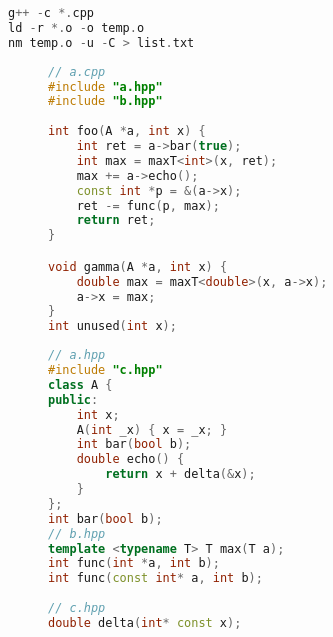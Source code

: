 \begin{lstlisting}[language=C++, caption={Các câu lệnh tìm nguyên mẫu hàm thiếu định nghĩa cần quan tâm sử dụng trình biên dịch.}, label={cod:command-undef},  captionpos=b]
g++ -c *.cpp
ld -r *.o -o temp.o
nm temp.o -u -C > list.txt
\end{lstlisting}

\begin{figure}[t]
    \begin{minipage}[t]{0.49\linewidth}
    \begin{lstlisting}[language=C++, caption={Mã nguồn tệp a.cpp.}, label={cod:undef-cpp}, captionpos=b]
// a.cpp
#include "a.hpp"
#include "b.hpp"
    
int foo(A *a, int x) {
    int ret = a->bar(true);
    int max = maxT<int>(x, ret);
    max += a->echo();
    const int *p = &(a->x);
    ret -= func(p, max);
    return ret;
}

void gamma(A *a, int x) {
    double max = maxT<double>(x, a->x);
    a->x = max;
}
int unused(int x);
    \end{lstlisting}
    \end{minipage}
    \begin{minipage}[t]{0.49\linewidth}
    \begin{lstlisting}[language=C++, caption={Mã nguồn tệp a.hpp, b.hpp và c.hpp.}, label={cod:undef-hpp}, captionpos=b]
// a.hpp
#include "c.hpp"
class A {
public: 
    int x;
    A(int _x) { x = _x; }
    int bar(bool b);
    double echo() {
        return x + delta(&x);
    }
};
int bar(bool b);
// b.hpp
template <typename T> T max(T a);
int func(int *a, int b);
int func(const int* a, int b);
    
// c.hpp
double delta(int* const x);  
    \end{lstlisting}
\end{minipage}
\end{figure}

